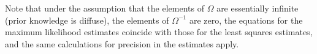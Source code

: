\documentclass[a4paper,fleqn]{cas-dc}
\begin{document}
Note that under the assumption that the elements of $\Omega$ are essentially infinite (prior knowledge is diffuse), the elements of $\Omega^{-1}$ are zero, the equations for the maximum likelihood estimates coincide with those for the least squares estimates, and the same calculations for precision in the estimates apply.


%
%
%
%
%
%
%
%
\end{document}

